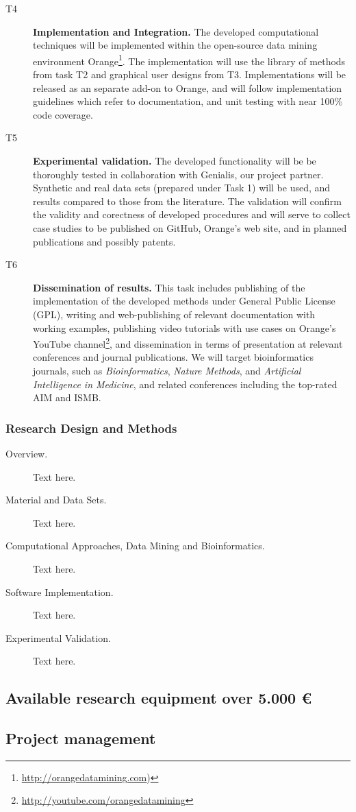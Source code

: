 \documentclass[11pt,a4paper]{article}
\renewcommand{\bold}{\textbf}
\begin{document}
\begin{description}
	\item[T4] \bold{Implementation and Integration.} The developed computational techniques will be implemented within the open-source data mining environment Orange\footnote{\url{http://orangedatamining.com})}. The implementation will use the library of methods from task T2 and graphical user designs from T3. Implementations will be released as an separate add-on to Orange, and will follow implementation guidelines which refer to documentation, and unit testing with near 100\% code coverage.
	\item[T5] \bold{Experimental validation.} The developed functionality will be be thoroughly tested in collaboration with Genialis, our project partner. Synthetic and real data sets (prepared under Task 1) will be used, and results compared to those from the literature. The validation will confirm the validity and corectness of developed procedures and will serve to collect case studies to be published on GitHub, Orange's web site, and in planned publications and possibly patents.
	\item[T6] \bold{Dissemination of results.} This task includes publishing of the implementation of the developed methods under General Public License (GPL), writing and web-publishing of relevant documentation with working examples, publishing video tutorials with use cases on Orange's YouTube channel\footnote{\url{http://youtube.com/orangedatamining}}, and dissemination in terms of presentation at relevant conferences and journal publications. We will target bioinformatics journals, such as {\em Bioinformatics}, {\em Nature Methods}, and {\em Artificial Intelligence in Medicine}, and related conferences including the top-rated AIM and ISMB.
\end{description}

\subsubsection{Research Design and Methods}
\begin{description}
	\item[Overview.] Text here.
	\item[Material and Data Sets.] Text here.
	\item[Computational Approaches, Data Mining and Bioinformatics.] Text here.
	\item[Software Implementation.] Text here.
	\item[Experimental Validation.] Text here.
\end{description}

\subsection{Available research equipment over 5.000 €}

\subsection{Project management}
\end{document}
